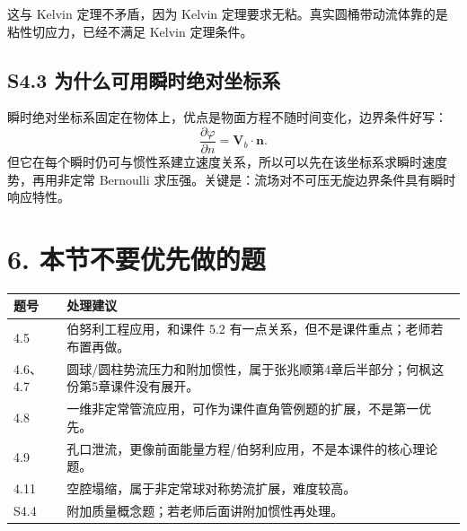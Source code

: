 \documentclass[UTF8,zihao=-4]{ctexart}
\begin{document}
这与 Kelvin 定理不矛盾，因为 Kelvin 定理要求无粘。真实圆桶带动流体靠的是粘性切应力，已经不满足 Kelvin 定理条件。

\subsection*{S4.3 为什么可用瞬时绝对坐标系}

瞬时绝对坐标系固定在物体上，优点是物面方程不随时间变化，边界条件好写：
\[
\frac{\partial\varphi}{\partial n}
=\bm V_b\cdot\bm n.
\]
但它在每个瞬时仍可与惯性系建立速度关系，所以可以先在该坐标系求瞬时速度势，再用非定常 Bernoulli 求压强。关键是：流场对不可压无旋边界条件具有瞬时响应特性。

\section*{6. 本节不要优先做的题}

\begin{longtable}{p{2.2cm}p{12.5cm}}
\toprule
题号 & 处理建议 \\
\midrule
4.5 & 伯努利工程应用，和课件 5.2 有一点关系，但不是课件重点；老师若布置再做。\\
4.6、4.7 & 圆球/圆柱势流压力和附加惯性，属于张兆顺第4章后半部分；何枫这份第5章课件没有展开。\\
4.8 & 一维非定常管流应用，可作为课件直角管例题的扩展，不是第一优先。\\
4.9 & 孔口泄流，更像前面能量方程/伯努利应用，不是本课件的核心理论题。\\
4.11 & 空腔塌缩，属于非定常球对称势流扩展，难度较高。\\
S4.4 & 附加质量概念题；若老师后面讲附加惯性再处理。\\
\bottomrule
\end{longtable}
\end{document}
